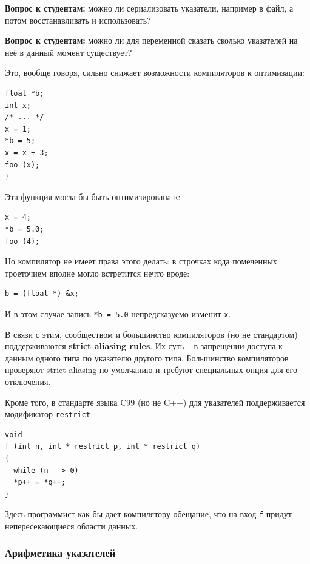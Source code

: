 \documentclass[a4paper,12pt,oneside]{article}
\newif\ifanswers
\begin{document}
\textbf{Вопрос к студентам:} можно ли сериализовать указатели, например в файл, а потом восстанавливать и использовать?

\ifanswers
Ответ: да, в течении срока жизни того, на что они указывают.
\fi

\textbf{Вопрос к студентам:} можно ли для переменной сказать сколько указателей на неё в данный момент существует?

\ifanswers
Ответ: увы, нет. Никакая переменная не ``знает'' о том, что кто-то взял её адрес и т.п.
\fi

Это, вообще говоря, сильно снижает возможности компиляторов к оптимизации:

\begin{lstlisting}
float *b; 
int x;
/* ... */
x = 1;
*b = 5;
x = x + 3;
foo (x);
}
\end{lstlisting}

Эта функция могла бы быть оптимизирована к:

\begin{lstlisting}
x = 4;
*b = 5.0;
foo (4);
\end{lstlisting}

Но компилятор не имеет права этого делать: в строчках кода помеченных троеточием вполне могло встретится нечто вроде:

\begin{lstlisting}
b = (float *) &x;
\end{lstlisting}

И в этом случае запись \lstinline!*b = 5.0! непредсказуемо изменит \lstinline!x!.

В связи с этим, сообществом и большинство компиляторов (но не стандартом) поддерживаются \textbf{strict aliasing rules}\label{StrictAliasing}. Их суть -- в запрещении доступа к данным одного типа по указателю другого типа. Большинство компиляторов проверяют strict aliasing по умолчанию и требуют специальных опция для его отключения.

Кроме того, в стандарте языка C99 (но не C++) для указателей поддерживается модификатор \lstinline!restrict!

\begin{lstlisting}
void 
f (int n, int * restrict p, int * restrict q)
{
  while (n-- > 0)
  *p++ = *q++;
}
\end{lstlisting}

Здесь программист как бы дает компилятору обещание, что на вход \lstinline!f! придут непересекающиеся области данных.

\subsubsection{Арифметика указателей}
\end{document}
